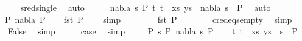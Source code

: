 \begin{isabellebody}
\ \ \ \ \isamarkupfalse%
\ sred{\isacharunderscore}{\kern0pt}single\ \isamarkupfalse%
\ auto\isanewline
\ \ \isamarkupfalse%
\ \isamarkupfalse%
\ {\isachardoublequoteopen}{\isasymexists}nabla{}\ s{}\ P{}{\isachardot}{\kern0pt}\ {\isacharparenleft}{\kern0pt}{\isacharparenleft}{\kern0pt}t{}{\isacharcomma}{\kern0pt}\ t{}{\isacharparenright}{\kern0pt}\ {\isacharhash}{\kern0pt}\ xs{\isacharcomma}{\kern0pt}\ ys{\isacharparenright}{\kern0pt}\ {\isasymTurnstile}\ {\isacharparenleft}{\kern0pt}nabla{}{\isacharcomma}{\kern0pt}\ s{}{\isacharparenright}{\kern0pt}\ {\isasymRightarrow}\ P{}{\isachardoublequoteclose}\ \isamarkupfalse%
\ auto\isanewline
{}\isamarkupfalse%
\isanewline
\ \ \isamarkupfalse%
\ {\isacharparenleft}{\kern0pt}{}\ P{}\ nabla{}\ P{}{\isacharparenright}{\kern0pt}\isanewline
\ \ \isamarkupfalse%
\ {\isachardoublequoteopen}fst\ P{}\ {\isasymnoteq}\ {\isacharbrackleft}{\kern0pt}{\isacharbrackright}{\kern0pt}{\isachardoublequoteclose}\ \isamarkupfalse%
\ simp\isanewline
\ \ \isamarkupfalse%
\ \isamarkupfalse%
\ {}{\isacharparenleft}{\kern0pt}{}{\isacharparenright}{\kern0pt}\ \isamarkupfalse%
\ {\isachardoublequoteopen}fst\ P{}\ {\isacharequal}{\kern0pt}\ {\isacharbrackleft}{\kern0pt}{\isacharbrackright}{\kern0pt}{\isachardoublequoteclose}\isanewline
\ \ \ \ \isamarkupfalse%
\ c{\isacharunderscore}{\kern0pt}red{\isacharunderscore}{\kern0pt}eqs{\isacharunderscore}{\kern0pt}empty\ \isamarkupfalse%
\ simp\isanewline
\ \ \isamarkupfalse%
\ \isamarkupfalse%
\ False\ \isamarkupfalse%
\ simp\isanewline
\ \ \isamarkupfalse%
\ \isamarkupfalse%
\ {\isacharquery}{\kern0pt}case\ \isamarkupfalse%
\ simp\isanewline
{}\isamarkupfalse%
\isanewline
\ \ \isamarkupfalse%
\ {\isacharparenleft}{\kern0pt}{}\ P{}\ s{}\ P{\isacharprime}{\kern0pt}\ nabla{}\ s{}\ P{}{\isacharparenright}{\kern0pt}\isanewline
\ \ \isamarkupfalse%
\ {\isachardoublequoteopen}{\isacharparenleft}{\kern0pt}{\isacharparenleft}{\kern0pt}{\isacharparenleft}{\kern0pt}t{}{\isacharcomma}{\kern0pt}\ t{}{\isacharparenright}{\kern0pt}\ {\isacharhash}{\kern0pt}\ xs{\isacharcomma}{\kern0pt}\ ys{\isacharparenright}{\kern0pt}{\isacharparenright}{\kern0pt}\ {\isasymturnstile}\ s{}\ {\isasymleadsto}\ P{\isacharprime}{\kern0pt}{\isachardoublequoteclose}\ \isamarkupfalse%

\end{isabellebody}
